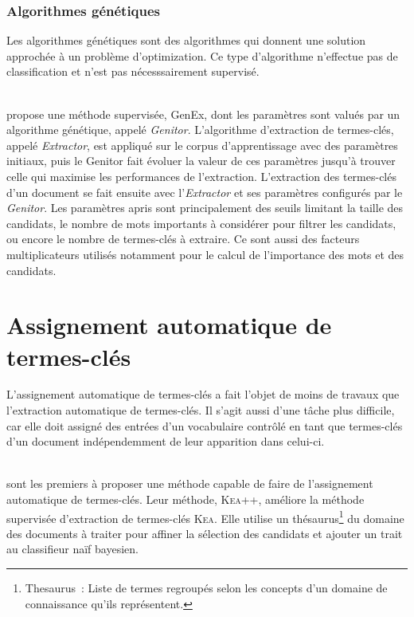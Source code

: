       \subsubsection{Algorithmes génétiques}
      \label{subsubsec:main-state_of_the_art-automatic_keyphrase_extraction-supervised_keyphrase_extraction-genex}
        Les algorithmes génétiques sont des algorithmes qui donnent une solution
        approchée à un problème d'optimization. Ce type d'algorithme
        n'effectue pas de classification et n'est pas nécesssairement supervisé.

        ~\\ propose une méthode
        supervisée, GenEx, dont les paramètres sont valués par un algorithme
        génétique, appelé \textit{Genitor}. L'algorithme d'extraction de
        termes-clés, appelé \textit{Extractor}, est appliqué sur le corpus
        d'apprentissage avec des paramètres initiaux, puis le Genitor fait
        évoluer la valeur de ces paramètres jusqu'à trouver celle qui maximise
        les performances de l'extraction. L'extraction des termes-clés d'un
        document se fait ensuite avec l'\textit{Extractor} et ses paramètres
        configurés par le \textit{Genitor}. Les paramètres apris sont
        principalement des seuils limitant la taille des candidats, le nombre de
        mots importants à considérer pour filtrer les candidats, ou encore le
        nombre de termes-clés à extraire. Ce sont aussi des facteurs
        multiplicateurs utilisés notamment pour le calcul de l'importance des
        mots et des candidats.

  \section{Assignement automatique de termes-clés}
  \label{sec:main-state_of_the_art-automatic_keyphrase_assignment}
    L'assignement automatique de termes-clés a fait l'objet de moins de travaux
    que l'extraction automatique de termes-clés. Il s'agit aussi d'une tâche
    plus difficile, car elle doit assigné des entrées d'un vocabulaire contrôlé
    en tant que termes-clés d'un document indépendemment de leur apparition dans
    celui-ci.

    ~\\ sont les premiers à proposer une
    méthode capable de faire de l'assignement automatique de termes-clés. Leur
    méthode, \textsc{Kea}++, améliore la méthode supervisée d'extraction de
    termes-clés \textsc{Kea}. Elle utilise un thésaurus\footnote{Thesaurus~:
    Liste de termes regroupés selon les concepts d'un domaine de connaissance
    qu'ils représentent.} du domaine des documents à traiter pour affiner la
    sélection des candidats et ajouter un trait au classifieur naïf bayesien.

